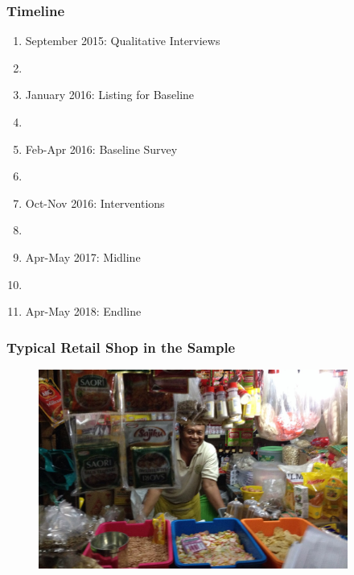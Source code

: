 \documentclass[10pt]{beamer}
\begin{document}
\begin{frame}
\frametitle{Timeline}
\begin{enumerate}
    \item September 2015: \textcolor[rgb]{0.00,0.07,1.00}{Qualitative} Interviews
    \item[]
    \item January 2016: \textcolor[rgb]{0.00,0.07,1.00}{Listing} for Baseline
    \item[]
    \item Feb-Apr 2016: \textcolor[rgb]{0.00,0.07,1.00}{Baseline} Survey
    \item[]
    \item Oct-Nov 2016: \textcolor[rgb]{0.00,0.07,1.00}{Interventions}
    \item[]
    \item Apr-May 2017: \textcolor[rgb]{0.00,0.07,1.00}{Midline}
    \item[]
    \item Apr-May 2018: \textcolor[rgb]{0.00,0.07,1.00}{Endline}
\end{enumerate}
\end{frame}


\begin{frame}
\frametitle{Typical Retail Shop in the Sample}

\begin{figure}[htbp]
	\centering
		\includegraphics[width=4in]{pics/retailer1.jpg}
	\label{height}
\end{figure}
\end{frame}
\end{document}
